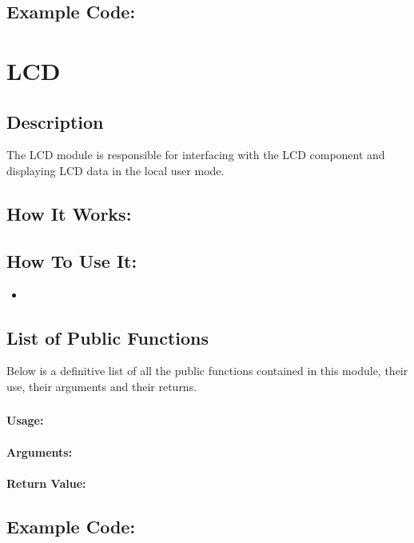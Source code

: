 \documentclass[]{report}
\begin{document}
\section{Example Code:}

\chapter{LCD}
\section{Description}
The LCD module is responsible for interfacing with the LCD component and displaying LCD data in the local user mode.

\section{How It Works:}

\section{How To Use It:}
\begin{itemize}
	\item 
\end{itemize}

\section{List of Public Functions}
Below is a definitive list of all the public functions contained in this module, their use, their arguments and their returns.

\subsection{}
\subsubsection{Usage:}

\subsubsection{Arguments:}

\subsubsection{Return Value:}

\section{Example Code:}
\end{document}
